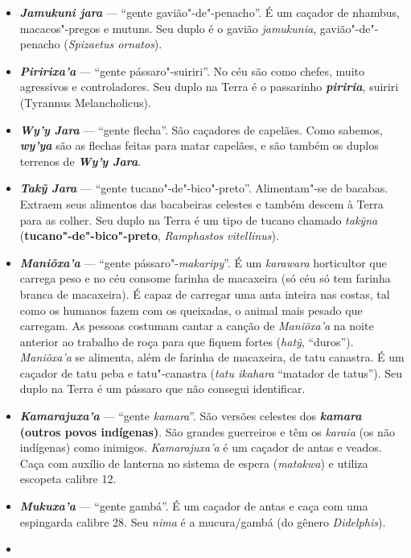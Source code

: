 \begin{itemize}
\item
  \textbf{\emph{Jamukuni jara}} --- ``gente gavião"-de"-penacho''. É um
  caçador de nhambus, macacos"-pregos e mutuns. Seu duplo é o gavião
  \emph{jamukunia}, gavião"-de"-penacho (\emph{Spizaetus ornatos}).
\item
  \emph{\textbf{Piririxa'a}} --- ``gente pássaro"-suiriri''. No céu são
  como chefes, muito agressivos e controladores. Seu duplo na Terra é o
  passarinho \emph{\textbf{piriria}}, suiriri (Tyrannus Melancholicus).
\item
  \emph{\textbf{Wy'y Jara}} --- ``gente flecha''. São caçadores de
  capelães. Como sabemos, \emph{\textbf{wy'ya}} são as flechas feitas
  para matar capelães, e são também os duplos terrenos de
  \emph{\textbf{Wy'y Jara}}.
\item
  \emph{\textbf{Takỹ Jara}} --- ``gente tucano"-de"-bico"-preto''.
  Alimentam"-se de bacabas. Extraem seus alimentos das bacabeiras
  celestes e também descem à Terra para as colher. Seu duplo na Terra é
  um tipo de tucano chamado \emph{takỹna}
  (\textbf{tucano"-de"-bico"-preto}, \emph{Ramphastos} \emph{vitellinus}).
\item
  \textbf{\emph{Maniõxa'a}} --- ``gente pássaro"-\emph{makaripy}''. É um
  \emph{karawara} horticultor que carrega peso e no céu consome farinha
  de macaxeira (só céu só tem farinha branca de macaxeira). É capaz de
  carregar uma anta inteira nas costas, tal como os humanos fazem com os
  queixadas, o animal mais pesado que carregam. As pessoas costumam
  cantar a canção de \emph{Maniõxa'a} na noite anterior ao trabalho de
  roça para que fiquem fortes (\emph{hatỹ}, ``duros''). \emph{Maniõxa'a}
  se alimenta, além de farinha de macaxeira, de tatu canastra. É um
  caçador de tatu peba e tatu"-canastra (\emph{tatu ikahara} ``matador de
  tatus''). Seu duplo na Terra é um pássaro que não consegui
  identificar.
\item
  \textbf{\emph{Kamarajuxa'a}} --- ``gente \emph{kamara}''. São versões
  celestes dos \textbf{\emph{kamara} (outros povos indígenas)}. São
  grandes guerreiros e têm os \emph{karaia} (os não indígenas) como
  inimigos. \emph{Kamarajuxa'a} é um caçador de antas e veados. Caça com
  auxílio de lanterna no sistema de espera (\emph{matakwa}) e utiliza
  escopeta calibre 12.
\item
  \emph{\textbf{Mukuxa'a}} --- ``gente gambá''. É um caçador de antas e
  caça com uma espingarda calibre 28. Seu \emph{nima} é a mucura/gambá
  (do gênero \emph{Didelphis}).
\item

\end{itemize}
